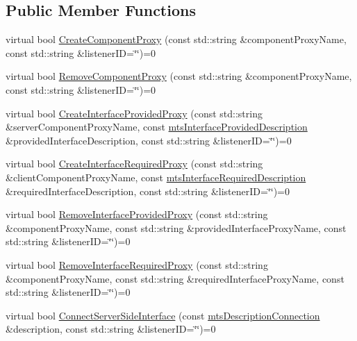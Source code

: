 \subsection*{Public Member Functions}
\begin{DoxyCompactItemize}
\item 
virtual bool \hyperlink{classmts_manager_local_interface_abfc11305625c7c4ce4c4bcefbd7efd33}{Create\+Component\+Proxy} (const std\+::string \&component\+Proxy\+Name, const std\+::string \&listener\+I\+D=\char`\"{}\char`\"{})=0
\item 
virtual bool \hyperlink{classmts_manager_local_interface_a652217c6fe0ad3d6a76fcd7fff7c0dc8}{Remove\+Component\+Proxy} (const std\+::string \&component\+Proxy\+Name, const std\+::string \&listener\+I\+D=\char`\"{}\char`\"{})=0
\item 
virtual bool \hyperlink{classmts_manager_local_interface_ad493767a207ec22ed33f6504895f1d94}{Create\+Interface\+Provided\+Proxy} (const std\+::string \&server\+Component\+Proxy\+Name, const \hyperlink{classmts_interface_provided_description}{mts\+Interface\+Provided\+Description} \&provided\+Interface\+Description, const std\+::string \&listener\+I\+D=\char`\"{}\char`\"{})=0
\item 
virtual bool \hyperlink{classmts_manager_local_interface_aee6b1f307a322614857eb18354f946d3}{Create\+Interface\+Required\+Proxy} (const std\+::string \&client\+Component\+Proxy\+Name, const \hyperlink{classmts_interface_required_description}{mts\+Interface\+Required\+Description} \&required\+Interface\+Description, const std\+::string \&listener\+I\+D=\char`\"{}\char`\"{})=0
\item 
virtual bool \hyperlink{classmts_manager_local_interface_a26a995efe03d1e5061f8eed130dfd368}{Remove\+Interface\+Provided\+Proxy} (const std\+::string \&component\+Proxy\+Name, const std\+::string \&provided\+Interface\+Proxy\+Name, const std\+::string \&listener\+I\+D=\char`\"{}\char`\"{})=0
\item 
virtual bool \hyperlink{classmts_manager_local_interface_a47397143664c81373bd0acb06e937ad6}{Remove\+Interface\+Required\+Proxy} (const std\+::string \&component\+Proxy\+Name, const std\+::string \&required\+Interface\+Proxy\+Name, const std\+::string \&listener\+I\+D=\char`\"{}\char`\"{})=0
\item 
virtual bool \hyperlink{classmts_manager_local_interface_a1c90c76d7ead2cc1fe9a31222d09aa54}{Connect\+Server\+Side\+Interface} (const \hyperlink{classmts_description_connection}{mts\+Description\+Connection} \&description, const std\+::string \&listener\+I\+D=\char`\"{}\char`\"{})=0

\end{DoxyCompactItemize}
